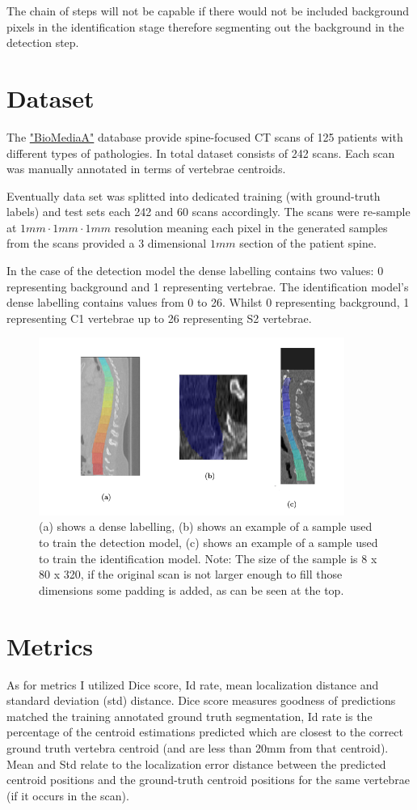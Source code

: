 The chain of steps will not be capable if there would not be included background pixels in the identification stage therefore segmenting out the background in the detection step.


\section{Dataset}
The \href{https://biomedia.doc.ic.ac.uk/}{\color{blue}"BioMediaA"} database provide spine-focused CT scans of 125 patients with different types of pathologies. In total dataset consists of 242 scans. Each scan was manually annotated in terms of vertebrae centroids. 

Eventually data set was splitted into dedicated training (with ground-truth labels) and test sets each 242 and 60 scans accordingly. The scans were re-sample at $1mm \cdot 1mm \cdot 1mm$ resolution meaning each pixel in the generated samples from the scans provided a 3 dimensional $1mm$ section of the patient spine.

In the case of the detection model the dense labelling contains two values: 0 representing background and 1 representing vertebrae. The identification model’s dense labelling contains values from 0 to 26. Whilst 0 representing background, 1 representing C1 vertebrae up to 26 representing S2 vertebrae.

\begin{figure}[h]
    \centering \includegraphics[width=10cm]{images/labeled_data.png}
    \caption {(a) shows a dense labelling, (b) shows an example of a sample used to train the detection model, (c) shows an example of a sample used to train the identification model. Note: The size of the sample is 8 x 80 x 320, if the original scan is not larger enough to fill those dimensions some padding is added, as can be seen at the top.}
    \label{fig:labeled_data}
\end{figure}

\newpage
\section{Metrics}
As for metrics I utilized Dice score, Id rate, mean localization distance and standard deviation (std) distance. Dice score measures goodness of predictions matched the training annotated ground truth segmentation, Id rate is the percentage of the centroid estimations predicted which are closest to the correct ground truth vertebra centroid (and are less than 20mm from that centroid). Mean and Std relate to the localization
error distance between the predicted centroid positions and the ground-truth centroid positions for the same vertebrae (if it occurs in the scan).

